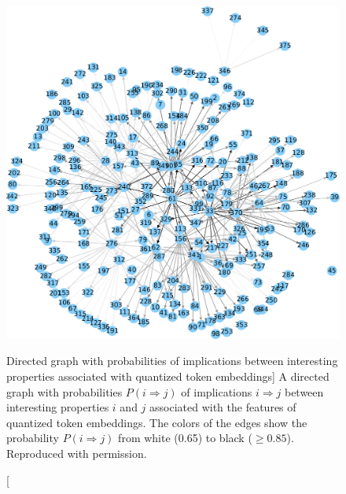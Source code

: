 \begin{figure}
\includegraphics{word2bits-implications}
\vspace{-0.5cm}
\caption
  [Directed graph with probabilities of implications between interesting
   properties associated with quantized token embeddings]%
  {A directed graph with probabilities $P(i ⇒ j)$ of implications $i ⇒ j$
   between interesting properties $i$ and $j$ associated with the features
   of quantized token embeddings. The colors of the edges show the probability
   $P(i ⇒ j)$ from white (0.65) to black ($≥ 0.85$).
   Reproduced with permission. \cite[Figure B.1]{stefanik2019semantic}}
\label{fig:formal-concept-analysis-with-quantized-token-embeddings}
\end{figure}
